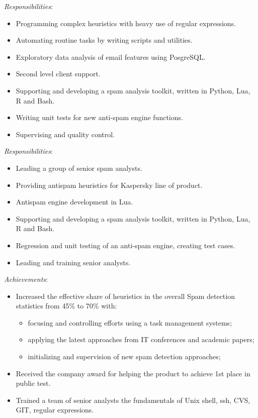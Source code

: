 \documentclass[11pt,a4paper,sans]{moderncv}        %
\newcommand{\responsibilities}[1]{ \emph{Responsibilities}:\begin{itemize} #1\end{itemize}}
\newcommand{\achievements}[1]{ \emph{Achievements}:\begin{itemize} #1\end{itemize}}
\begin{document}
 {
    \responsibilities {
        \item Programming complex heuristics with heavy use of regular expressions.
        \item Automating routine tasks by writing scripts and utilities.
        \item Exploratory data analysis of email features using PosgreSQL.
        \item Second level client support.
	\item Supporting and developing a spam analysis toolkit, written in Python, Lua, R and Bash.
        \item Writing unit tests for new anti-spam engine functions.
        \item Supervising and quality control.
    }
}
 {
    \responsibilities {
        \item Leading a group of senior spam analysts.
        \item Providing antispam heuristics for Kaspersky line of product.
        \item Antispam engine development in Lua.
        \item Supporting and developing a spam analysis toolkit, written in Python, Lua, R and Bash.
        \item Regression and unit testing of an anti-spam engine, creating test cases.
	\item Leading and training senior analysts.
    }
    \achievements {
        \item Increased the effective share of heuristics in the overall Spam detection statistics from 45\% to 70\% with:
        \begin{itemize}
            \item focusing and controlling efforts using a task management systems;
            \item applying the latest approaches from IT conferences and academic papers;
            \item initializing and supervision of new spam detection approaches;
        \end{itemize}
	\item Received the company award for helping the product to achieve 1st place in public test.
        \item Trained a team of senior analysts the fundamentals of Unix shell, ssh, CVS, GIT, regular expressions.
    }
}
\end{document}
